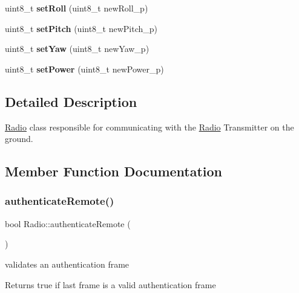 \begin{DoxyCompactItemize}
uint8\+\_\+t {\bfseries set\+Roll} (uint8\+\_\+t new\+Roll\+\_\+p)
\item 
\mbox{\label{class_radio_a66257b0c82021c0105a10fbdad4d72d6}} 
uint8\+\_\+t {\bfseries set\+Pitch} (uint8\+\_\+t new\+Pitch\+\_\+p)
\item 
\mbox{\label{class_radio_a989ecbc89925f1796e9c541ee8a21f11}} 
uint8\+\_\+t {\bfseries set\+Yaw} (uint8\+\_\+t new\+Yaw\+\_\+p)
\item 
\mbox{\label{class_radio_acb1f2c8565771be2a699c827325be7ad}} 
uint8\+\_\+t {\bfseries set\+Power} (uint8\+\_\+t new\+Power\+\_\+p)
\end{DoxyCompactItemize}


\subsection{Detailed Description}
\hyperlink{class_radio}{Radio} class responsible for communicating with the \hyperlink{class_radio}{Radio} Transmitter on the ground. 

\subsection{Member Function Documentation}
\mbox{\label{class_radio_a50a86b8fbc5cd906c721d54406f98b9b}} 
\subsubsection{\texorpdfstring{authenticate\+Remote()}{authenticateRemote()}}
{\footnotesize\ttfamily bool Radio\+::authenticate\+Remote (\begin{DoxyParamCaption}{ }\end{DoxyParamCaption})}



validates an authentication frame 

\begin{DoxyReturn}{Returns}
true if last frame is a valid authentication frame 
\end{DoxyReturn}
\mbox{\label{class_radio_acb313b8c4ccfbe9eed993d566e563f89}} 
